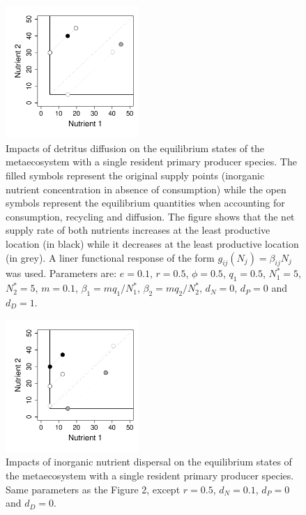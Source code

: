 \documentclass[12pt]{paper}
\begin{document}
\begin{figure}[p]
   \centering
   \includegraphics[width=0.45\textwidth]{DetritusDiffusion.pdf}
   \caption{Impacts of detritus diffusion on the equilibrium states of the metaecosystem with a single resident primary producer species. The filled symbols represent the original supply points (inorganic nutrient concentration in absence of consumption) while the open symbols represent the equilibrium quantities when accounting for consumption, recycling and diffusion. The figure shows that the net supply rate of both nutrients increases at the least productive location (in black) while it decreases at the least productive location (in grey). A liner functional response of the form $g_{ij}(N_{j}) = \beta_{ij}N_j$ was used. Parameters are: $e=0.1$, $r= 0.5$, $\phi=0.5$, $q_1 = 0.5$, $N^*_1=5$, $N^*_2=5$, $m =0.1$, $\beta_1 = mq_1/N^*_1$, $\beta_2 = mq_2/N^*_2$, $d_N = 0$, $d_P = 0$ and $d_D = 1$.
}
   \label{f:Detritus}
\end{figure}
\newpage

\begin{figure}[p]
   \centering
   \includegraphics[width=0.45\textwidth]{NutrientDiffusion.pdf}
   \caption{Impacts of inorganic nutrient dispersal on the equilibrium states of the metaecosystem with a single resident primary producer species. Same parameters as the Figure 2, except $r = 0.5$, $d_N = 0.1$, $d_P = 0$ and $d_D = 0$.}
   \label{f:Nutrients}
\end{figure}
\newpage
\end{document}
